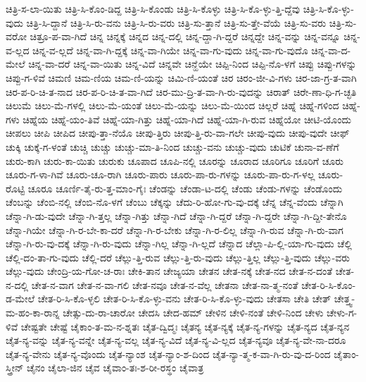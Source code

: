 {ಚಿತ್ರಿ-ಸ-ಲಾ-ಯಿತು
ಚಿತ್ರಿ-ಸಿ-ಕೊಂ-ಡಿದ್ದ
ಚಿತ್ರಿ-ಸಿ-ಕೊಂಡು
ಚಿತ್ರಿ-ಸಿ-ಕೊಳ್ಳು
ಚಿತ್ರಿ-ಸಿ-ಕೊ-ಳ್ಳು-ತ್ತಿ-ದ್ದೆವು
ಚಿತ್ರಿ-ಸಿ-ಕೊ-ಳ್ಳು-ವುದು
ಚಿತ್ರಿ-ಸಿ-ದ್ದಾನೆ
ಚಿತ್ರಿ-ಸಿ-ರು-ವನು
ಚಿತ್ರಿ-ಸಿ-ರು-ವರು
ಚಿತ್ರಿ-ಸು-ತ್ತಾನೆ
ಚಿತ್ರಿ-ಸು-ತ್ತೇ-ವೆಯೆ
ಚಿತ್ರಿ-ಸು-ವರು
ಚಿತ್ರಿ-ಸು-ವರೋ
ಚಿತ್ರೂ-ಪ-ವಾ-ಗಿದೆ
ಚಿನ್ನ
ಚಿನ್ನಕ್ಕೆ
ಚಿನ್ನದ
ಚಿನ್ನ-ದಲ್ಲಿ
ಚಿನ್ನ-ದ್ದಾ-ಗಿ-ದ್ದರೆ
ಚಿನ್ನದ್ದೇ
ಚಿನ್ನ-ವನ್ನು
ಚಿನ್ನ-ವನ್ನೂ
ಚಿನ್ನ-ವ-ಲ್ಲದ
ಚಿನ್ನ-ವ-ಲ್ಲದೆ
ಚಿನ್ನ-ವಾ-ಗಿ-ದ್ದಕ್ಕೆ
ಚಿನ್ನ-ವಾ-ಗಿಯೇ
ಚಿನ್ನ-ವಾ-ಗು-ವುದು
ಚಿನ್ನ-ವಾ-ಗು-ವುದೊ
ಚಿನ್ನ-ವಾ-ದ-ಮೇಲೆ
ಚಿನ್ನ-ವಾ-ದರೆ
ಚಿನ್ನ-ವಾ-ಯಿತು
ಚಿನ್ನ-ವಿದೆ
ಚಿನ್ನವೇ
ಚಿನ್ಹೆಯೇ
ಚಿಪ್ಪಿ-ನಿಂದ
ಚಿಪ್ಪಿ-ನೊ-ಳಗೆ
ಚಿಪ್ಪು
ಚಿಪ್ಪು-ಗಳನ್ನು
ಚಿಪ್ಪು-ಗ-ಳಿವೆ
ಚಿಮಣಿ
ಚಿಮ-ಣಿಯ
ಚಿಮ-ಣಿ-ಯನ್ನು
ಚಿಮಿ-ಣಿ-ಯಂತೆ
ಚಿರ
ಚಿರಂ-ಜೀ-ವಿ-ಗಳು
ಚಿರ-ಜಾ-ಗ್ರ-ತ-ವಾಗಿ
ಚಿರ-ಪ-ರಿ-ಚಿ-ತ-ನಾದ
ಚಿರ-ಪ-ರಿ-ಚಿ-ತ-ವಾ-ಗಿದೆ
ಚಿರ-ಮು-ದ್ರಿ-ತ-ವಾ-ಗಿ-ರು-ವುದನ್ನು
ಚಿರಾತ್
ಚಿರೇ-ಣಾ-ಧಿ-ಗ-ಚ್ಛತಿ
ಚಿಲುಮೆ
ಚಿಲು-ಮೆ-ಗಳಲ್ಲಿ
ಚಿಲು-ಮೆ-ಯಂತೆ
ಚಿಲು-ಮೆ-ಯನ್ನು
ಚಿಲು-ಮೆ-ಯಿಂದ
ಚಿಲ್ಲರೆ
ಚಿಹ್ನೆ
ಚಿಹ್ನೆ-ಗಳಿಂದ
ಚಿಹ್ನೆ-ಗಳು
ಚಿಹ್ನೆಯ
ಚಿಹ್ನೆ-ಯಂ-ತಿವೆ
ಚಿಹ್ನೆ-ಯಾ-ಗಿತ್ತು
ಚಿಹ್ನೆ-ಯಾ-ಗಿದೆ
ಚಿಹ್ನೆ-ಯಾ-ಗಿ-ರುವ
ಚಿಹ್ನೆಯೋ
ಚೀಟಿ-ಯೊಂದು
ಚೀಪಲು
ಚೀಪಿ
ಚೀಪಿದ
ಚೀಪು-ತ್ತಾ-ನೆಯೊ
ಚೀಪು-ತ್ತಿರು
ಚೀಪು-ತ್ತಿ-ರು-ವಾ-ಗಲೇ
ಚೀಪು-ವುದು
ಚೀಪು-ವುದೇ
ಚೀಫ್
ಚುಕ್ಕಿ
ಚುಕ್ಕೆ-ಗ-ಳಂತೆ
ಚುಚ್ಚಿ
ಚುಚ್ಚು
ಚುಚ್ಚು-ಮಾ-ತಿ-ನಿಂದ
ಚುಚ್ಚು-ವನು
ಚುಚ್ಚು-ವುದು
ಚುಟಿಕೆ
ಚುನಾ-ವ-ಣೆಗೆ
ಚುರು-ಕಾಗಿ
ಚುರು-ಕಾ-ಯಿತು
ಚುರುಕು
ಚೂಪಾದ
ಚೂಪಿ-ನಲ್ಲಿ
ಚೂರನ್ನು
ಚೂರಾದ
ಚೂರಿಗೂ
ಚೂರಿಗೆ
ಚೂರು
ಚೂರು-ಗ-ಳಾ-ಗಿವೆ
ಚೂರು-ಚೂ-ರಾಗಿ
ಚೂರು-ಪಾರು
ಚೂರು-ಪಾ-ರು-ಗಳನ್ನು
ಚೂರು-ಪಾ-ರು-ಗ-ಳಲ್ಲ
ಚೂರು-ರೊಟ್ಟಿ
ಚೂರೂ
ಚೂರ್ಣಿ-ತೈ-ರು-ತ್ತ-ಮಾಂ-ಗೈಃ
ಚೆಂಡನ್ನು
ಚೆಂಡಾ-ಟ-ದಲ್ಲಿ
ಚೆಂಡು
ಚೆಂಡು-ಗಳನ್ನು
ಚೆಂಡೊಂದು
ಚೆಂಬನ್ನು
ಚೆಂಬಿ-ನಲ್ಲಿ
ಚೆಂಬಿ-ನೊ-ಳಗೆ
ಚೆಂಬು
ಚೆಕ್ಕನ್ನು
ಚೆದು-ರಿ-ಹೋ-ಗು-ವು-ದಕ್ಕೆ
ಚೆನ್ನ
ಚೆನ್ನ-ವೆಂದು
ಚೆನ್ನಾಗಿ
ಚೆನ್ನಾ-ಗಿ-ಡು-ವುದೇ
ಚೆನ್ನಾ-ಗಿ-ತ್ತಲ್ಲ
ಚೆನ್ನಾ-ಗಿತ್ತು
ಚೆನ್ನಾ-ಗಿದೆ
ಚೆನ್ನಾ-ಗಿ-ದ್ದರೆ
ಚೆನ್ನಾ-ಗಿ-ದ್ದರೇ
ಚೆನ್ನಾ-ಗಿ-ದ್ದೀ-ತೇನೊ
ಚೆನ್ನಾ-ಗಿಯೇ
ಚೆನ್ನಾ-ಗಿ-ರ-ಬೇ-ಕಾ-ದರೆ
ಚೆನ್ನಾ-ಗಿ-ರ-ಬೇಕು
ಚೆನ್ನಾ-ಗಿ-ರ-ಲಿಲ್ಲ
ಚೆನ್ನಾ-ಗಿ-ರುವ
ಚೆನ್ನಾ-ಗಿ-ರು-ವಾಗ
ಚೆನ್ನಾ-ಗಿ-ರು-ವು-ದಕ್ಕೆ
ಚೆನ್ನಾ-ಗಿ-ರು-ವುದು
ಚೆನ್ನಾ-ಗಿಲ್ಲ
ಚೆನ್ನಾ-ಗಿ-ಲ್ಲದೆ
ಚೆನ್ನಾದ
ಚೆಲ್ಲಾ-ಪಿ-ಲ್ಲಿ-ಯಾ-ಗು-ವುದು
ಚೆಲ್ಲಿ
ಚೆಲ್ಲಿ-ದಂ-ತಾ-ಗು-ವುದು
ಚೆಲ್ಲಿ-ದರೆ
ಚೆಲ್ಲು-ತ್ತಿ-ರುವ
ಚೆಲ್ಲು-ತ್ತಿ-ರು-ವುದು
ಚೆಲ್ಲು-ತ್ತಿಲ್ಲ
ಚೆಲ್ಲು-ತ್ತಿ-ವುದು
ಚೆಲ್ಲು-ವರು
ಚೆಲ್ಲು-ವುದು
ಚೇಂದ್ರಿ-ಯ-ಗೋ-ಚ-ರಾಃ
ಚೇಕಿ-ತಾನ
ಚೇಜ್ಯಯಾ
ಚೇತನ
ಚೇತ-ನಕ್ಕೆ
ಚೇತ-ನದ
ಚೇತ-ನ-ದಂತೆ
ಚೇತ-ನ-ದಲ್ಲಿ
ಚೇತ-ನ-ವಾಗ
ಚೇತ-ನ-ವಾ-ಗಲಿ
ಚೇತ-ನವೂ
ಚೇತ-ನ-ವೆಲ್ಲ
ಚೇತನಾ
ಚೇತ-ನಾ-ತ್ಮ-ನಂತೆ
ಚೇತ-ರಿ-ಸಿ-ಕೊಂ-ಡ-ಮೇಲೆ
ಚೇತ-ರಿ-ಸಿ-ಕೊ-ಳ್ಳಲಿ
ಚೇತ-ರಿ-ಸಿ-ಕೊ-ಳ್ಳು-ವನು
ಚೇತ-ರಿ-ಸಿ-ಕೊ-ಳ್ಳು-ವುದು
ಚೇತಸಾ
ಚೇತಿ
ಚೇತ್
ಚೇತ್ತ್ವ-ಮ-ಹಂ-ಕಾ-ರಾನ್ನ
ಚೇತ್ಸು-ದು-ರಾ-ಚಾರೋ
ಚೇದಸಿ
ಚೇದ-ಹಮ್
ಚೇಳಿನ
ಚೇಳಿ-ನಂತೆ
ಚೇಳಿ-ನಿಂದ
ಚೇಳು
ಚೇಳು-ಗ-ಳಿವೆ
ಚೇಷ್ಟತೇ
ಚೇಷ್ಟೆ
ಚೈಕಾಂ-ತ-ಮ-ನ-ಶ್ನತಃ
ಚೈತ-ದ್ವಿದ್ಮಃ
ಚೈತನ್ಯ
ಚೈತ-ನ್ಯಕ್ಕೆ
ಚೈತ-ನ್ಯ-ಗಳನ್ನು
ಚೈತ-ನ್ಯದ
ಚೈತ-ನ್ಯನ
ಚೈತ-ನ್ಯ-ವನ್ನು
ಚೈತ-ನ್ಯ-ವನ್ನೇ
ಚೈತ-ನ್ಯ-ವಲ್ಲ
ಚೈತ-ನ್ಯ-ವಿದೆ
ಚೈತ-ನ್ಯ-ವಿ-ಲ್ಲದ
ಚೈತ-ನ್ಯವೂ
ಚೈತ-ನ್ಯ-ವೇ-ನಾ-ದರೂ
ಚೈತ-ನ್ಯ-ವೇನು
ಚೈತ-ನ್ಯ-ವೊಂದು
ಚೈತ-ನ್ಯಾಂಶ
ಚೈತ-ನ್ಯಾಂ-ಶ-ದಿಂದ
ಚೈತ-ನ್ಯಾ-ತ್ಮ-ಕ-ವಾ-ಗಿ-ರು-ವು-ದ-ರಿಂದ
ಚೈತಾಂ-ಸ್ತ್ರೀನ್
ಚೈನಂ
ಚೈಲಾ-ಜಿನ
ಚೈವ
ಚೈವಾಂ-ತಃ-ಶ-ರೀ-ರಸ್ಥಂ
ಚೈವಾತ್ರ
}
